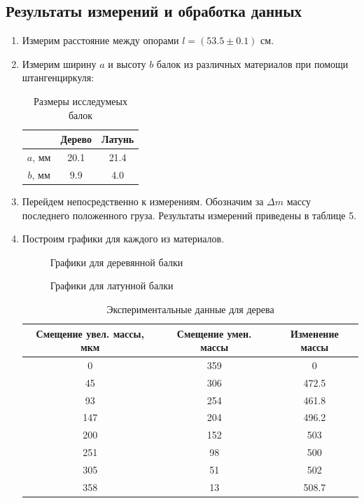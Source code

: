 \documentclass[12pt]{article}
\begin{document}
    \subsection{Результаты измерений и обработка данных}
    \begin{enumerate}
        \item Измерим расстояние между опорами $l = (53.5 \pm 0.1)$ см.
        \item Измерим ширину $a$ и высоту $b$ балок из различных
        материалов при помощи штангенциркуля:
        \begin{table}[H]
            \centering
            \caption{Размеры исследумеых балок}
            \begin{tabular}{|c|c|c|}
            \hline
                    & Дерево & Латунь \\ \hline
            $a$, мм & 20.1   & 21.4   \\ \hline
            $b$, мм & 9.9     & 4.0    \\ \hline
            \end{tabular}
        \end{table}

        \item Перейдем непосредственно к измерениям. Обозначим за $\Delta m$ массу
        последнего положенного груза. Результаты измерений приведены
        в таблице 5.
        \item Построим графики для каждого из материалов.
        \begin{figure}[H]
            \centering
            \caption{Графики для деревянной балки}
            
        \end{figure}
        \begin{figure}[H]
            \centering
            \caption{Графики для латунной балки}
            
        \end{figure}
        \begin{table}[H]
            \centering
            \caption{Экспериментальные данные для дерева}
        \begin{tabular}{|c|c|c|}
            \hline
            Смещение увел. массы, мкм & Смещение умен. массы & Изменение массы \\ \hline
            0  & 359  & 0     \\ \hline
            45  & 306  & 472.5    \\ \hline
            93 & 254  & 461.8    \\ \hline
            147 & 204  & 496.2    \\ \hline
            200 & 152  & 503      \\ \hline
            251 & 98   & 500      \\ \hline
            305 & 51   & 502      \\ \hline
            358 & 13   & 508.7    \\ \hline
            \end{tabular}
        \end{table}


\end{enumerate}
\end{document}
